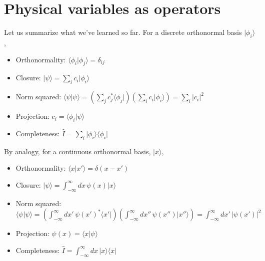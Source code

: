\documentclass{Textbook}
\begin{document}
\section{Physical variables as operators}
Let us summarize what we've learned so far. For a discrete orthonormal basis $\vert \phi_i \rangle$, 
\begin{itemize}
\item Orthonormality: $\langle \phi_i \vert \phi_j \rangle = \delta_{ij}$
\item Closure: $\vert \psi \rangle = \sum_i c_i \vert \phi_i \rangle$
\item Norm squared: $\langle \psi \vert \psi \rangle = \left( \sum_j c_j^* \langle \phi_j \vert \right) \left(  \sum_i c_i \vert \phi_i \rangle \right) = \sum_i \vert c_i \vert ^2$
\item Projection: $c_i = \langle \phi_i \vert \psi \rangle$
\item Completeness: $\hat{I} = \sum_i \vert \phi_i \rangle \langle \phi_i \vert$
\end{itemize}
By analogy, for a continuous orthonormal basis, $\vert x \rangle$, 
\begin{itemize}
\item Orthonormality: $\langle x \vert x' \rangle = \delta(x-x')$
\item Closure: $\vert \psi \rangle = \int_{-\infty}^{\infty} dx\, \psi(x) \vert x \rangle$
\item Norm squared: $\langle \psi \vert \psi \rangle = \left( \int_{-\infty}^{\infty} dx'\, \psi(x')^* \langle x' \vert \right) \left(  \int_{-\infty}^{\infty} dx''\, \psi(x'') \vert x'' \rangle \right) = \int_{-\infty}^{\infty} dx'\, \vert \psi(x') \vert^2$
\item Projection: $\psi(x) = \langle x \vert \psi \rangle$
\item Completeness: $\hat{I} = \int_{-\infty}^{\infty} dx\, \vert x \rangle \langle x \vert$
\end{itemize}
\end{document}
